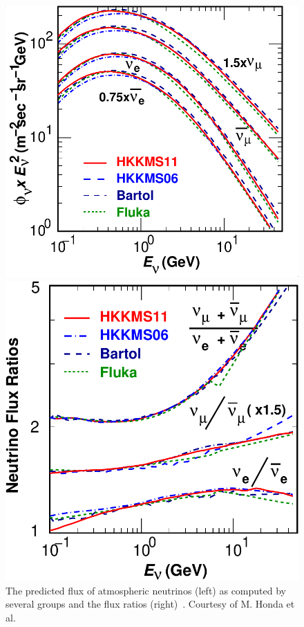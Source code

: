 \begin{figure}[htbp]
\begin{minipage}[c]{.46\linewidth}
   	      \includegraphics[width=0.9\linewidth]{figures/fig7a-c.pdf}
   \end{minipage} \hfill
   \begin{minipage}{.46\linewidth}
      \includegraphics[width=0.9\linewidth]{figures/fig7b-c.pdf}
   \end{minipage}
    \caption{The predicted flux of atmospheric neutrinos (left) as computed by several groups and the flux ratios (right)~\cite{PhysRevD.83.123001}. Courtesy of M. Honda et al. }
 \label{fig:nuatmflux}
\end{figure}


